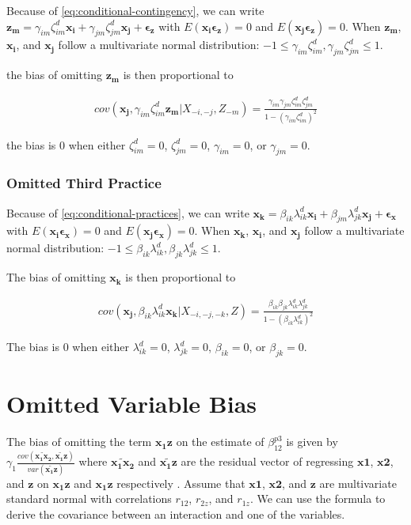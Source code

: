 \documentclass[12pt]{article}
\begin{document}
Because of \eqref{eq:conditional-contingency}, we can write $\mathbf{z_m} = \gamma_{im} \zeta^d_{im} \mathbf{x_i} + \gamma_{jm} \zeta^d_{jm} \mathbf{x_j} + \mathbf{\epsilon_z}$ with $E(\mathbf{x_i \epsilon_z}) = 0$ and $E(\mathbf{x_j \epsilon_z}) = 0$. When $\mathbf{z_m}$, $\mathbf{x_i}$, and $\mathbf{x_j}$ follow a multivariate normal distribution: $-1 \leq \gamma_{im} \zeta^d_{im}, \gamma_{jm} \zeta^d_{jm} \leq 1$. 

the bias of omitting $\mathbf{z_m}$ is then proportional to

\begin{align*}
    cov(\mathbf{x_j}, \gamma_{im} \zeta^d_{im} \mathbf{z_m} | X_{-i, -j}, Z_{-m}) = \frac{\gamma_{im} \gamma_{jm} \zeta^d_{im} \zeta^d_{jm}}{1 - (\gamma_{im} \zeta^d_{im})^2}
\end{align*}

the bias is 0 when either $\zeta^d_{im} = 0$, $\zeta^d_{jm} = 0$, $\gamma_{im} = 0$, or $\gamma_{jm} = 0$.

\subsubsection{Omitted Third Practice}

Because of \eqref{eq:conditional-practices}, we can write $\mathbf{x_k} = \beta_{ik} \lambda^d_{ik} \mathbf{x_i} + \beta_{jm} \lambda^d_{jk} \mathbf{x_j} + \mathbf{\epsilon_x}$ with $E(\mathbf{x_i \epsilon_x}) = 0$ and $E(\mathbf{x_j \epsilon_x}) = 0$. When $\mathbf{x_k}$, $\mathbf{x_i}$, and $\mathbf{x_j}$ follow a multivariate normal distribution: $-1 \leq \beta_{ik} \lambda^d_{ik}, \beta_{jk} \lambda^d_{jk} \leq 1$. 

The bias of omitting $\mathbf{x_k}$ is then proportional to

\begin{align*}
    cov(\mathbf{x_j}, \beta_{ik} \lambda^d_{ik} \mathbf{x_k} | X_{-i, -j, -k}, Z) = \frac{\beta_{ik} \beta_{jk} \lambda^d_{ik} \lambda^d_{jk}}{1 - (\beta_{ik} \lambda^d_{ik})^2}
\end{align*}

The bias is 0 when either $\lambda^d_{ik} = 0$, $\lambda^d_{jk} = 0$, $\beta_{ik} = 0$, or $\beta_{jk} = 0$.

\section{Omitted Variable Bias} \label{appendix-omitted}

The bias of omitting the term $\mathbf{x_1 z}$ on the estimate of $\beta^{p3}_{12}$ is given by $\gamma_1 \frac{cov(\widetilde{\mathbf{x_1 x_2}}, \widetilde{\mathbf{x_1 z}})} {var(\widetilde{\mathbf{x_1 z}})}$ where $\widetilde{\mathbf{x_1 x_2}}$ and $\widetilde{\mathbf{x_1 z}}$ are the residual vector of regressing $\mathbf{x1}$, $\mathbf{x2}$, and $\mathbf{z}$ on $\mathbf{x_1 z}$ and $\mathbf{x_1 z}$ respectively \citep{angrist2008mostly,cunningham_causal_2018}. 
Assume that $\mathbf{x1}$, $\mathbf{x2}$, and $\mathbf{z}$ are multivariate standard normal with correlations $r_{12}$, $r_{2z}$, and $r_{1z}$. We can use the \citet{isserlis_formula_1918} formula to derive the covariance between an interaction and one of the variables. 
\end{document}
